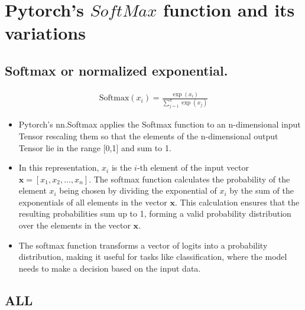 \section{Pytorch's $SoftMax$ function and its variations}

\subsection*{Softmax or normalized exponential.} \label{sec:softmax}

\begin{align}
    \text{Softmax}(x_i) = \frac{{\exp(x_i)}}{{\sum_{j=1}^n \exp(x_j)}} \label{eq:softmax}
\end{align}

\begin{itemize}
    \item Pytorch's nn.Softmax applies the Softmax function to an n-dimensional input Tensor rescaling them so that the elements of the n-dimensional output Tensor lie in the range [0,1] and sum to 1.
    \item In this representation, \(x_i\) is the \(i\)-th element of the input vector \(\mathbf{x} = [x_1, x_2, \ldots, x_n]\). The softmax function calculates the probability of the element \(x_i\) being chosen by dividing the exponential of \(x_i\) by the sum of the exponentials of all elements in the vector \(\mathbf{x}\). This calculation ensures that the resulting probabilities sum up to 1, forming a valid probability distribution over the elements in the vector \(\mathbf{x}\).
    \item The softmax function transforms a vector of logits into a probability distribution, making it useful for tasks like classification, where the model needs to make a decision based on the input data.
\end{itemize}
















\subsection*{\acf{ALL}}

